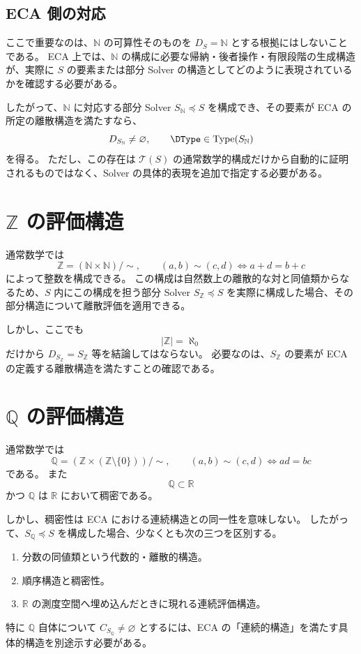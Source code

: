 \documentclass[a4paper,11pt]{article}
\newcommand{\N}{\mathbb{N}}
\newcommand{\Z}{\mathbb{Z}}
\newcommand{\Q}{\mathbb{Q}}
\newcommand{\R}{\mathbb{R}}
\newcommand{\SubSolver}{\preceq}
\newcommand{\Type}{\operatorname{Type}}
\begin{document}
\subsection{ECA 側の対応}
ここで重要なのは、$\N$ の可算性そのものを $D_S=\N$ とする根拠にはしないことである。
ECA 上では、$\N$ の構成に必要な帰納・後者操作・有限段階の生成構造が、実際に $S$ の要素または部分 Solver の構造としてどのように表現されているかを確認する必要がある。

したがって、$\N$ に対応する部分 Solver $S_{\N}\SubSolver S$ を構成でき、その要素が ECA の所定の離散構造を満たすなら、
\[
D_{S_{\N}}\neq\varnothing,
\qquad
\DType\in\Type(S_{\N})
\]
を得る。
ただし、この存在は $\mathcal{T}(S)$ の通常数学的構成だけから自動的に証明されるものではなく、Solver の具体的表現を追加で指定する必要がある。

\section{$\mathbb{Z}$ の評価構造}
通常数学では
\[
\Z=(\N\times\N)/\sim,
\qquad
(a,b)\sim(c,d)\iff a+d=b+c
\]
によって整数を構成できる。
この構成は自然数上の離散的な対と同値類からなるため、$S$ 内にこの構成を担う部分 Solver $S_{\Z}\SubSolver S$ を実際に構成した場合、その部分構造について離散評価を適用できる。

しかし、ここでも
\[
|\Z|=\aleph_0
\]
だけから $D_{S_{\Z}}=S_{\Z}$ 等を結論してはならない。
必要なのは、$S_{\Z}$ の要素が ECA の定義する離散構造を満たすことの確認である。

\section{$\mathbb{Q}$ の評価構造}
通常数学では
\[
\Q=(\Z\times(\Z\setminus\{0\}))/\sim,
\qquad
(a,b)\sim(c,d)\iff ad=bc
\]
である。
また
\[
\Q\subset\R
\]
かつ $\Q$ は $\R$ において稠密である。

しかし、稠密性は ECA における連続構造との同一性を意味しない。
したがって、$S_{\Q} \SubSolver S$ を構成した場合、少なくとも次の三つを区別する。
\begin{enumerate}
\item 分数の同値類という代数的・離散的構造。
\item 順序構造と稠密性。
\item $\R$ の測度空間へ埋め込んだときに現れる連続評価構造。
\end{enumerate}
特に $\Q$ 自体について $C_{S_{\Q}} \neq \varnothing$ とするには、ECA の「連続的構造」を満たす具体的構造を別途示す必要がある。
\end{document}
